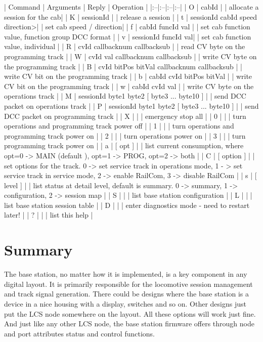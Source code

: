 | Command | Arguments | Reply | Operation |
|:--|:--|:--|:--|
| O | cabId | | allocate a session for the cab|
| K | sessionId | | release a session |
| t | sessionId cabId speed direction>| | set cab speed / direction|
| f | cabId funcId val | | set cab function value, function group DCC format |
| v | sessionId funcId val| | set cab function value, individual |
| R | cvId callbacknum callbacksub | | read CV byte on the programming track |
| W | cvId val callbacknum callbacksub | | write CV byte on the programming track |
| B | cvId bitPos bitVal callbacknum callbacksub | | write CV bit on the programming track |
| b | cabId cvId bitPos bitVal | | write CV bit on the programming track |
| w | cabId cvId val | | write CV byte on the operations track |
| M | sessionId byte1 byte2 [ byte3 ... byte10 ] | | send DCC packet on operations track |
| P | sessionId byte1 byte2 [ byte3 ... byte10 ] | | send DCC packet on programming track |
| X | | | emergency stop all |
| 0 | | | turn operations and programming track power off |
| 1 | | | turn operations and programming track power on |
| 2 | | | turn operations power on |
| 3 | | | turn programming track power on |
| a | [ opt ] | | list current consumption, where opt=0 -> MAIN (default ), opt=1 -> PROG, opt=2 -> both |
| C | [ option ] | | set options for the track. 0 -> set service track in operations mode, 1 - > set service track in service mode, 2 -> enable RailCom, 3 -> disable RailCom |
| s | [ level ] | | list status at detail level, default is summary. 0 -> summary, 1 -> configuration,  2 -> session map |
| S | | | list base station configuration |
| L | | | list base station session table |
| D | | | enter diagnostics mode - need to restart later! |
| ? | | | list this help |

























\section{Summary}

The base station, no matter how it is implemented, is a key component in any digital layout. It is primarily responsible for the locomotive session management and track signal generation. There could be designs where the base station is a device in a nice housing with a display, switches and so on. Other designs just put the LCS node somewhere on the layout. All these options will work just fine. And just like any other LCS node, the base station firmware offers through node and port attributes status and control functions.

